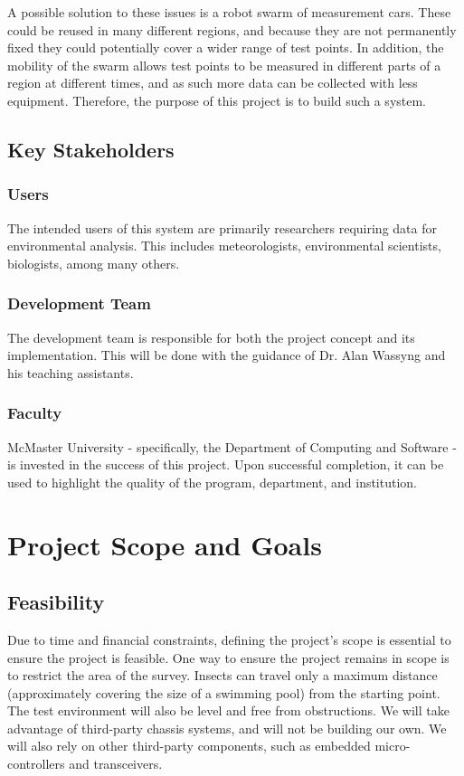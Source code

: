 \documentclass[11pt]{article}
\begin{document}
A possible solution to these issues is a robot swarm of measurement cars. These could be reused in many different regions, and because they are not permanently fixed they could potentially cover a wider range of test points. In addition, the mobility of the swarm allows test points to be measured in different parts of a region at different times, and as such more data can be collected with less equipment. Therefore, the purpose of this project is to build such a system.

\subsection{Key Stakeholders}
\subsubsection{Users}
The intended users of this system are primarily researchers requiring data for environmental analysis. This includes meteorologists, environmental scientists, biologists, among many others.
\subsubsection{Development Team}
The development team is responsible for both the project concept and its implementation. This will be done with the guidance of Dr. Alan Wassyng and his teaching assistants.
\subsubsection{Faculty}
McMaster University - specifically, the Department of Computing and Software - is invested in the success of this project. Upon successful completion, it can be used to highlight the quality of the program, department, and institution.

\section{Project Scope and Goals}
\subsection{Feasibility}
Due to time and financial constraints, defining the project's scope is essential to ensure the project is feasible. One way to ensure the project remains in scope is to restrict the area of the survey. Insects can travel only a maximum distance (approximately covering the size of a swimming pool) from the starting point. The test environment will also be level and free from obstructions. We will take advantage of third-party chassis systems, and will not be building our own. We will also rely on other third-party components, such as embedded micro-controllers and transceivers.
\end{document}
